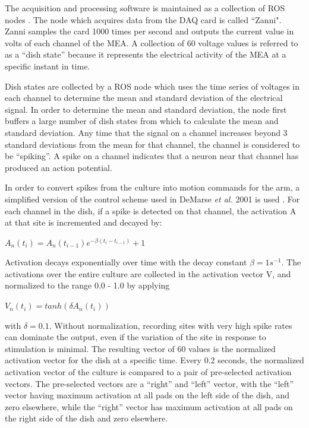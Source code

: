 \documentclass[letterpaper]{article}
\begin{document}
The acquisition and processing software is maintained as a collection of ROS nodes \cite{ROSAnnouncementPaper}.
The node which acquires data from the DAQ card is called ``Zanni". 
Zanni samples the card 1000 times per second and outputs the current value in volts of each channel of the MEA. 
A collection of 60 voltage values is referred to as a ``dish state'' because it represents the electrical activity of the MEA at a specific instant in time. 

Dish states are collected by a ROS node which uses the time series of voltages in each channel to determine the mean and standard deviation of the electrical signal. 
In order to determine the mean and standard deviation, the node first buffers a large number of dish states from which to calculate the mean and standard deviation. 
Any time that the signal on a channel increases beyond 3 standard deviations from the mean for that channel, the channel is considered to be ``spiking''. 
A spike on a channel indicates that a neuron near that channel has produced an action potential. 

In order to convert spikes from the culture into motion commands for the arm, a simplified version of the control scheme used in DeMarse \textit{et al.} 2001 is used . 
For each channel in the dish, if a spike is detected on that channel, the activation A at that site is incremented and decayed by: 

$A_n (t_i) = A_n(t_{i-1})e^{-\beta(t_i - t_{i-1})} + 1$

Activation decays exponentially over time with the decay constant $\beta=1s^{-1}$.
The activations over the entire culture are collected in the activation vector V, and normalized to the range 0.0 - 1.0 by applying

$V_n(t_i) = tanh(\delta A_n(t_i))$

\noindent with $\delta=0.1$. Without normalization, recording sites with very high spike rates can dominate the output, even if the variation of the site in response to stimulation is minimal. 
The resulting vector of 60 values is the normalized activation vector for the dish at a specific time.
Every 0.2 seconds, the normalized activation vector of the culture is compared to a pair of pre-selected activation vectors. 
The pre-selected vectors are a ``right'' and ``left'' vector, with the ``left'' vector having maximum activation at all pads on the left side of the dish, and zero elsewhere, while the ``right'' vector has maximum activation at all pads on the right side of the dish and zero elsewhere. 
\end{document}
